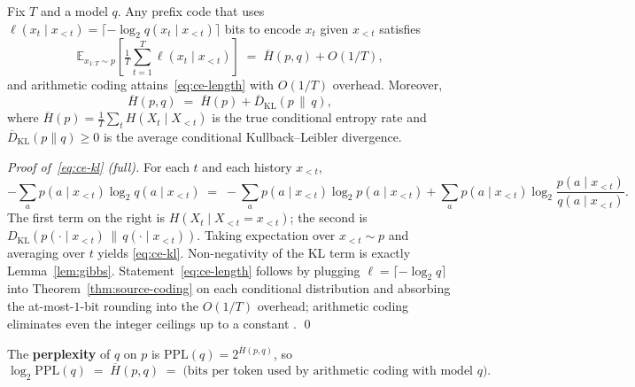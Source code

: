 \begin{theorem}[Cross-entropy = expected code length]
\label{thm:ce-code}
Fix $T$ and a model $q$. Any prefix code that uses
$\ell(x_t \mid x_{<t}) = \lceil -\log_2 q(x_t \mid x_{<t})\rceil$ bits
to encode $x_t$ given $x_{<t}$ satisfies
\begin{equation}
  \mathbb{E}_{x_{1:T}\sim p}\!\left[\tfrac{1}{T}\!\sum_{t=1}^{T}\ell(x_t \mid x_{<t})\right]
  \;=\; \overline{H}(p, q) + O(1/T), \label{eq:ce-length}
\end{equation}
and arithmetic coding attains~\eqref{eq:ce-length} with $O(1/T)$
overhead. Moreover,
\begin{equation}
  \overline{H}(p, q)
  \;=\; \overline{H}(p) + \overline{D}_{\mathrm{KL}}(p \,\|\, q), \label{eq:ce-kl}
\end{equation}
where $\overline{H}(p) = \tfrac{1}{T}\sum_t H(X_t \mid X_{<t})$ is the
true conditional entropy rate and
$\overline{D}_{\mathrm{KL}}(p\|q) \ge 0$ is the average conditional
Kullback--Leibler divergence.
\end{theorem}

\emph{Proof of~\eqref{eq:ce-kl} (full).} For each $t$ and each history
$x_{<t}$,
\[
  -\sum_{a} p(a\!\mid\! x_{<t})\log_2 q(a\!\mid\! x_{<t})
  \;=\;
  -\sum_{a} p(a\!\mid\! x_{<t})\log_2 p(a\!\mid\! x_{<t})
  + \sum_a p(a\!\mid\! x_{<t})\log_2\frac{p(a\!\mid\! x_{<t})}{q(a\!\mid\! x_{<t})}.
\]
The first term on the right is $H(X_t \mid X_{<t} = x_{<t})$; the
second is $D_{\mathrm{KL}}(p(\cdot\mid x_{<t})\,\|\,q(\cdot\mid x_{<t}))$.
Taking expectation over $x_{<t} \sim p$ and averaging over $t$ yields
\eqref{eq:ce-kl}. Non-negativity of the KL term is exactly
Lemma~\ref{lem:gibbs}. Statement~\eqref{eq:ce-length} follows by
plugging $\ell = \lceil -\log_2 q\rceil$ into
Theorem~\ref{thm:source-coding} on each conditional distribution and
absorbing the at-most-$1$-bit rounding into the $O(1/T)$ overhead;
arithmetic coding eliminates even the integer ceilings up to a
constant \citep[Ch.\ 5]{coverthomas2006}. \qed

\begin{corollary}
\label{cor:ppl}
The \textbf{perplexity} of $q$ on $p$ is
$\mathrm{PPL}(q) = 2^{\overline{H}(p,q)}$, so
\begin{equation}
  \log_2 \mathrm{PPL}(q) \;=\; \overline{H}(p,q)
  \;=\; \text{(bits per token used by arithmetic coding with model }q\text{)}. \label{eq:ppl-bpt}
\end{equation}
\end{corollary}


